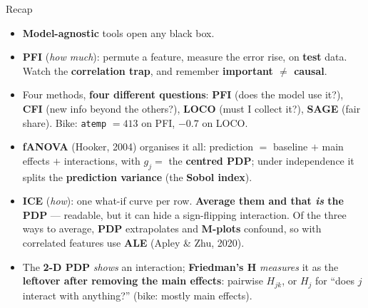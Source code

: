 \documentclass[aspectratio=169]{beamer}
\begin{document}
\begin{frame}{Recap}
  \begin{itemize}\small
    \item \textbf{Model-agnostic} tools open any black box.
    \item \textbf{PFI} (\emph{how much}): permute a feature, measure the error rise, on \textbf{test}
      data. Watch the \textbf{correlation trap}, and remember \textbf{important $\neq$ causal}.
    \item Four methods, \textbf{four different questions}: \textbf{PFI} (does the model use it?),
      \textbf{CFI} (new info beyond the others?), \textbf{LOCO} (must I collect it?), \textbf{SAGE}
      (fair share). Bike: \texttt{atemp} $= 413$ on PFI, $\mathbf{-0.7}$ on LOCO.
    \item \textbf{fANOVA} (Hooker, 2004) organises it all: prediction $=$ baseline $+$ main effects
      $+$ interactions, with $g_j = $ the \textbf{centred PDP}; under independence it splits the
      \textbf{prediction variance} (the \textbf{Sobol index}).
    \item \textbf{ICE} (\emph{how}): one what-if curve per row. \textbf{Average them and that
      \emph{is} the PDP} --- readable, but it can hide a sign-flipping interaction. Of the three
      ways to average, \textbf{PDP} extrapolates and \textbf{M-plots} confound, so with correlated
      features use \textbf{ALE} (Apley \& Zhu, 2020).
    \item The \textbf{2-D PDP} \emph{shows} an interaction; \textbf{Friedman's H} \emph{measures} it
      as the \textbf{leftover after removing the main effects}: pairwise $H_{jk}$, or $H_j$ for
      ``does $j$ interact with anything?'' (bike: mostly main effects).
  \end{itemize}
  \vfill
\end{frame}
\end{document}
